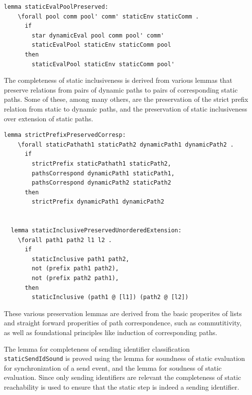 \documentclass[letterpaper, 11pt]{extarticle}
\begin{document}
\begin{lstlisting}[language=logic, mathescape]
  lemma staticEvalPoolPreserved:
    \forall pool comm pool' comm' staticEnv staticComm .
      if
        star dynamicEval pool comm pool' comm' 
        staticEvalPool staticEnv staticComm pool
      then
        staticEvalPool staticEnv staticComm pool'
\end{lstlisting}

The completeness of static inclusiveness is derived from various lemmas that
preserve relations from pairs of dynamic paths to pairs of corresponding static paths.  
Some of these, among many others, are
the preservation of the strict prefix relation from static to dynamic paths,
and the preservation of static inclusiveness over extension of static paths.

\begin{lstlisting}[language=logic, mathescape]
  lemma strictPrefixPreservedCorresp:
    \forall staticPathath1 staticPath2 dynamicPath1 dynamicPath2 .
      if
        strictPrefix staticPathath1 staticPath2, 
        pathsCorrespond dynamicPath1 staticPath1,
        pathsCorrespond dynamicPath2 staticPath2
      then
        strictPrefix dynamicPath1 dynamicPath2


  lemma staticInclusivePreservedUnorderedExtension:
    \forall path1 path2 l1 l2 .
      if
        staticInclusive path1 path2, 
        not (prefix path1 path2),
        not (prefix path2 path1), 
      then
        staticInclusive (path1 @ [l1]) (path2 @ [l2])
\end{lstlisting}

These various preservation lemmas are derived from the basic properites of lists 
and straight forward properities of path correspondence, such as commutitivity, as
well as foundational principles like induction of corresponding paths.

The lemma for completeness of sending identifier classification \lstinline{staticSendIdSound}
is proved using the lemma for
soundness of static evaluation for synchronization of a send event,
and the lemma for soudness of static evaluation.
Since only sending identifiers are relevant the completeness of static reachability is
used to ensure that the static step is indeed a sending identifier. 
\end{document}
